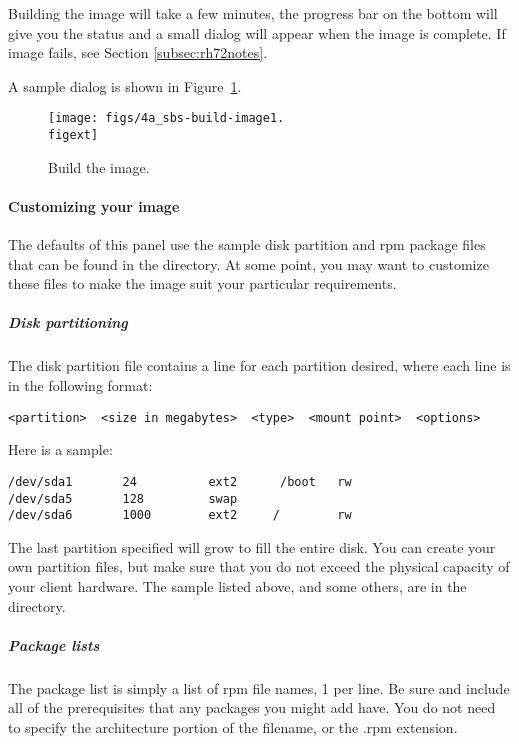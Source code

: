 Building the image will take a few minutes, the progress bar on the bottom 
will give you the status and a small dialog will appear when the image
is complete.  If image fails, see Section \ref{subsec:rh72notes}.
  
A sample dialog is shown in Figure~\ref{fig:detailed-build-image}. 

\begin{figure}[htbp]
  \begin{center}
    \texttt{[image: figs/4a\_sbs-build-image1.\\figext]}
    \caption{Build the image.}
    \label{fig:detailed-build-image}
  \end{center}
\end{figure}
  
\paragraph{Customizing your image}

The defaults of this panel use the sample disk partition and rpm package files
that can be found in the  directory.
At some point, you may want to customize these files to make the image
suit your particular requirements.

\subparagraph{Disk partitioning}

The disk partition file contains a line for each partition desired, where
each line is in the following format:

\begin{verbatim}
<partition>  <size in megabytes>  <type>  <mount point>  <options>
\end{verbatim}

Here is a sample:

\begin{verbatim}
/dev/sda1       24          ext2      /boot   rw
/dev/sda5       128         swap
/dev/sda6       1000        ext2     /        rw
\end{verbatim}

The last partition specified will grow to fill the entire disk.
You can create your own partition files, but make sure that you
do not exceed the physical capacity of your client hardware. The sample
listed above, and some others, are in the  directory.

\subparagraph{Package lists}
The package list is simply a list of rpm file names, 1
per line. Be sure and include all of the prerequisites that
any packages you might add have. You do not need to specify
the architecture portion of the filename, or the .rpm extension.

